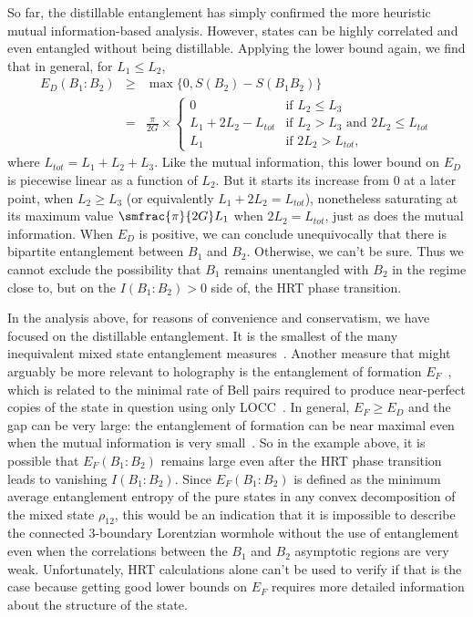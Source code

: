 \documentclass[12pt]{article}
\newcommand{\beq}{\begin{eqnarray}}
\newcommand{\eeq}{\end{eqnarray}}
\numberwithin{equation}{section}
\begin{document}
So far, the distillable entanglement has simply confirmed the more heuristic mutual information-based analysis. However, states can be highly correlated and even entangled without being distillable. Applying the lower bound again, we find that in general, for $L_1 \leq L_2$,
\beq
E_D(B_1 : B_2 )
&\geq& \max\{ 0, S( B_2 ) - S( B_1 B_2 ) \} \\
&=& \nonumber
	\frac{\pi}{2G} \times
	\begin{cases}
		0 & \text{if } L_2 \leq L_3 \\
		L_1 + 2 L_2 - L_{tot} & \text{if }  L_2 > L_3 \text{ and } 2 L_2 \leq L_{tot} \\
		L_1 & \text{if } 2 L_2 > L_{tot},
	\end{cases}
\eeq
where $L_{tot} = L_1 + L_2 + L_3.$
Like the mutual information, this lower bound on $E_D$ is piecewise linear as a function of $L_2$. But it starts its increase from $0$ at a later point, when $L_2 \geq L_3$ (or equivalently $L_1 + 2 L_2 = L_{tot}$), nonetheless saturating at its maximum value  $\smfrac{\pi}{2G} L_1$ when $2 L_2 = L_{tot}$, just as does the mutual information. When $E_D$ is positive, we can conclude unequivocally that there is bipartite entanglement between $B_1$ and $B_2$. Otherwise, we can't be sure.  Thus we cannot exclude the possibility that $B_1$ remains unentangled with $B_2$ in the regime close to, but on the $I(B_1:B_2) >0$ side of, the HRT phase transition.


In the analysis above, for reasons of convenience and conservatism, we have focused on the distillable entanglement.  It is the smallest of the many inequivalent mixed state entanglement measures~\cite{horodecki2000limits}. Another measure that might arguably be more relevant to holography is the entanglement of formation $E_F$~\cite{bennett1996mixed}, which is related to the minimal rate of Bell pairs required to produce near-perfect copies of the state in question using only LOCC~\cite{hayden2001asymptotic}. In general, $E_F \geq E_D$ and the gap can be very large: the entanglement of formation can be near maximal even when the mutual information is very small~\cite{hayden2006aspects}.  So in the example above, it is possible that $E_F(B_1:B_2)$ remains large even after the HRT phase transition leads to vanishing $I(B_1:B_2)$. Since $E_F(B_1:B_2)$ is defined as the minimum average entanglement entropy of the pure states in any convex decomposition of the mixed state $\rho_{1 2}$, this
would be an indication that it is impossible to describe the connected 3-boundary Lorentzian wormhole without the use of entanglement even when the correlations between the $B_1$ and $B_2$ asymptotic regions are very weak. Unfortunately, HRT calculations alone can't be used to verify if that is the case because getting good lower bounds on $E_F$ requires more detailed information about the structure of the state.
\end{document}
